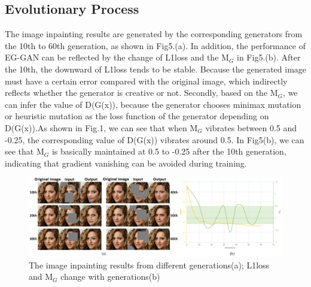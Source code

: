 \documentclass[journal]{IEEEtran}
\begin{document}
    \subsection{Evolutionary Process}
    The image inpainting results are generated by the corresponding generators from the 10th to 60th generation, as shown in Fig5.(a). In addition, the performance of EG-GAN can be reflected by the change of L1loss and the M$_{G}$ in Fig5.(b). After the 10th, the downward of L1loss tends to be stable. Because the generated image must have a certain error compared with the original image, which indirectly reflects whether the generator is creative or not. Secondly, based on the M$_{G}$, we can infer the value of D(G(x)), because the generator chooses minimax mutation or heuristic mutation as the loss function of the generator depending on D(G(x)).As shown in Fig.1, we can see that when M$_{G}$ vibrates between 0.5 and -0.25, the corresponding value of D(G(x)) vibrates around 0.5. In Fig5(b), we can see that M$_{G}$ is basically maintained at 0.5 to -0.25 after the 10th generation, indicating that gradient vanishing can be avoided during training.
    \begin{figure}[H]
       \centering
       \includegraphics[width=1\linewidth]{figures/Fig5.png}
       \caption{The image inpainting results from different generations(a); L1loss and M$_{G}$ change with generations(b)}
       \label{fig:Fig5}
    \end{figure}
\end{document}
